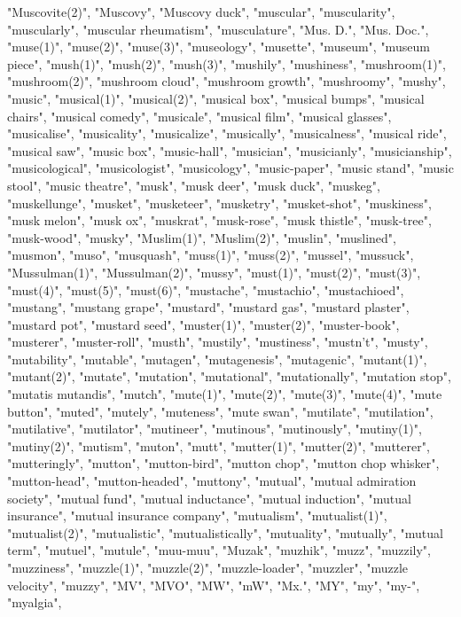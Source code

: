"Muscovite(2)",
"Muscovy",
"Muscovy duck",
"muscular",
"muscularity",
"muscularly",
"muscular rheumatism",
"musculature",
"Mus. D.",
"Mus. Doc.",
"muse(1)",
"muse(2)",
"muse(3)",
"museology",
"musette",
"museum",
"museum piece",
"mush(1)",
"mush(2)",
"mush(3)",
"mushily",
"mushiness",
"mushroom(1)",
"mushroom(2)",
"mushroom cloud",
"mushroom growth",
"mushroomy",
"mushy",
"music",
"musical(1)",
"musical(2)",
"musical box",
"musical bumps",
"musical chairs",
"musical comedy",
"musicale",
"musical film",
"musical glasses",
"musicalise",
"musicality",
"musicalize",
"musically",
"musicalness",
"musical ride",
"musical saw",
"music box",
"music-hall",
"musician",
"musicianly",
"musicianship",
"musicological",
"musicologist",
"musicology",
"music-paper",
"music stand",
"music stool",
"music theatre",
"musk",
"musk deer",
"musk duck",
"muskeg",
"muskellunge",
"musket",
"musketeer",
"musketry",
"musket-shot",
"muskiness",
"musk melon",
"musk ox",
"muskrat",
"musk-rose",
"musk thistle",
"musk-tree",
"musk-wood",
"musky",
"Muslim(1)",
"Muslim(2)",
"muslin",
"muslined",
"musmon",
"muso",
"musquash",
"muss(1)",
"muss(2)",
"mussel",
"mussuck",
"Mussulman(1)",
"Mussulman(2)",
"mussy",
"must(1)",
"must(2)",
"must(3)",
"must(4)",
"must(5)",
"must(6)",
"mustache",
"mustachio",
"mustachioed",
"mustang",
"mustang grape",
"mustard",
"mustard gas",
"mustard plaster",
"mustard pot",
"mustard seed",
"muster(1)",
"muster(2)",
"muster-book",
"musterer",
"muster-roll",
"musth",
"mustily",
"mustiness",
"mustn't",
"musty",
"mutability",
"mutable",
"mutagen",
"mutagenesis",
"mutagenic",
"mutant(1)",
"mutant(2)",
"mutate",
"mutation",
"mutational",
"mutationally",
"mutation stop",
"mutatis mutandis",
"mutch",
"mute(1)",
"mute(2)",
"mute(3)",
"mute(4)",
"mute button",
"muted",
"mutely",
"muteness",
"mute swan",
"mutilate",
"mutilation",
"mutilative",
"mutilator",
"mutineer",
"mutinous",
"mutinously",
"mutiny(1)",
"mutiny(2)",
"mutism",
"muton",
"mutt",
"mutter(1)",
"mutter(2)",
"mutterer",
"mutteringly",
"mutton",
"mutton-bird",
"mutton chop",
"mutton chop whisker",
"mutton-head",
"mutton-headed",
"muttony",
"mutual",
"mutual admiration society",
"mutual fund",
"mutual inductance",
"mutual induction",
"mutual insurance",
"mutual insurance company",
"mutualism",
"mutualist(1)",
"mutualist(2)",
"mutualistic",
"mutualistically",
"mutuality",
"mutually",
"mutual term",
"mutuel",
"mutule",
"muu-muu",
"Muzak",
"muzhik",
"muzz",
"muzzily",
"muzziness",
"muzzle(1)",
"muzzle(2)",
"muzzle-loader",
"muzzler",
"muzzle velocity",
"muzzy",
"MV",
"MVO",
"MW",
"mW",
"Mx.",
"MY",
"my",
"my-",
"myalgia",
